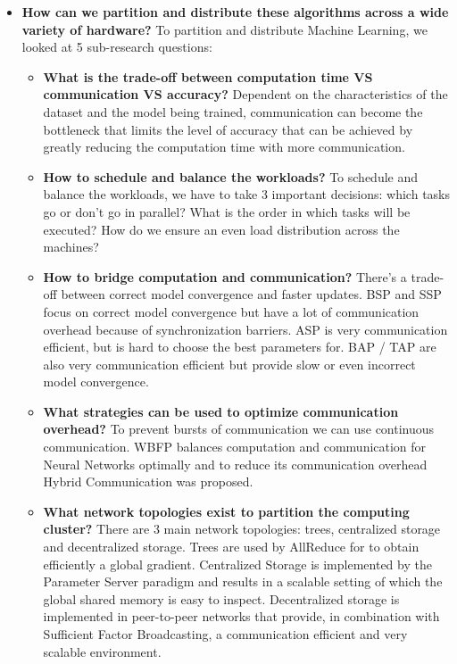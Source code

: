 \begin{itemize}
\begin{itemize}
\begin{itemize}
		\end{itemize}
		\item \textbf{How can we partition and distribute these algorithms across a wide variety of hardware?} To partition and distribute Machine Learning, we looked at 5 sub-research questions:
		\begin{itemize}
			\item \textbf{What is the trade-off between computation time VS communication VS accuracy?} Dependent on the characteristics of the dataset and the model being trained, communication can become the bottleneck that limits the level of accuracy that can be achieved by greatly reducing the computation time with more communication.
			\item \textbf{How to schedule and balance the workloads?} To schedule and balance the workloads, we have to take 3 important decisions: which tasks go or don't go in parallel? What is the order in which tasks will be executed? How do we ensure an even load distribution across the machines?
			\item \textbf{How to bridge computation and communication?} There's a trade-off between correct model convergence and faster updates. BSP and SSP focus on correct model convergence but have a lot of communication overhead because of synchronization barriers. ASP is very communication efficient, but is hard to choose the best parameters for. BAP / TAP are also very communication efficient but provide slow or even incorrect model convergence.
			\item \textbf{What strategies can be used to optimize communication overhead?} To prevent bursts of communication we can use continuous communication. WBFP balances computation and communication for Neural Networks optimally and to reduce its communication overhead Hybrid Communication was proposed.
			\item \textbf{What network topologies exist to partition the computing cluster?} There are 3 main network topologies: trees, centralized storage and decentralized storage. Trees are used by AllReduce for to obtain efficiently a global gradient. Centralized Storage is implemented by the Parameter Server paradigm and results in a scalable setting of which the global shared memory is easy to inspect. Decentralized storage is implemented in peer-to-peer networks that provide, in combination with Sufficient Factor Broadcasting, a communication efficient and very scalable environment.
		\end{itemize}
	\end{itemize}

\end{itemize}

